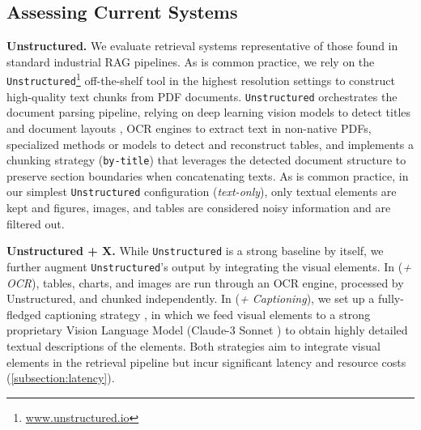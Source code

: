 \documentclass{article} %
\newcommand{\code}[1]{\texttt{#1}}
\begin{document}




\subsection{Assessing Current Systems}
\label{subsection:baseline_models}


\noindent\textbf{Unstructured.} We evaluate retrieval systems representative of those found in standard industrial RAG pipelines. As is common practice, we rely on the \code{Unstructured}\footnote{\url{www.unstructured.io}} off-the-shelf tool in the highest resolution settings to construct high-quality text chunks from PDF documents. \code{Unstructured} orchestrates the document parsing pipeline, relying on deep learning vision models to detect titles and document layouts \citep{ge_yolox_2021}, OCR engines \citep{smith_overview_2007} to extract text in non-native PDFs, specialized methods or models to detect and reconstruct tables, and implements a chunking strategy (\code{by-title}) that leverages the detected document structure to preserve section boundaries when concatenating texts. As is common practice, in our simplest \code{Unstructured} configuration (\textit{text-only}), only textual elements are kept and figures, images, and tables are considered noisy information and are filtered out.

\noindent\textbf{Unstructured + X.} While \code{Unstructured} is a strong baseline by itself, we further augment \code{Unstructured}'s output by integrating the visual elements. In (\textit{+ OCR}), tables, charts, and images are run through an OCR engine, processed by Unstructured, and chunked independently. In (\textit{+ Captioning}), we set up a fully-fledged captioning strategy \citep{zhao_retrieving_2023}, in which we feed visual elements to a strong proprietary Vision Language Model (Claude-3 Sonnet \citep{anthropic_claude_2024}) to obtain highly detailed textual descriptions of the elements.
Both strategies aim to integrate visual elements in the retrieval pipeline but incur significant latency and resource costs (\autoref{subsection:latency}).
\end{document}
